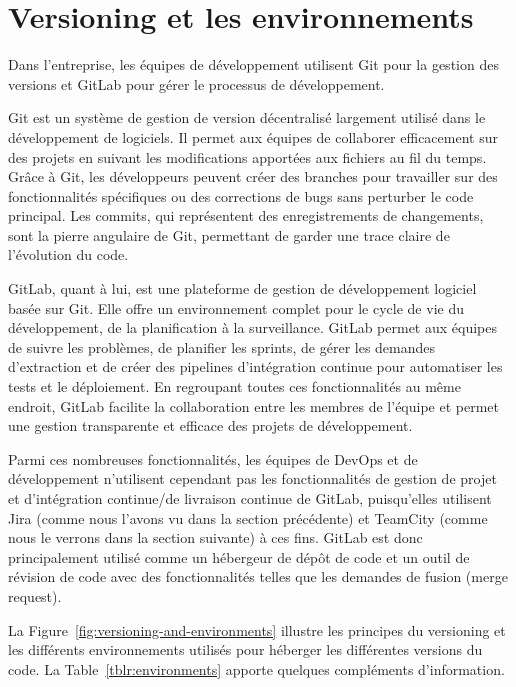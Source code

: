 \section{Versioning et les environnements}\label{sec:versioning-environments}

Dans l'entreprise, les équipes de développement utilisent Git pour la gestion des versions et GitLab pour gérer le processus de développement.

Git est un système de gestion de version décentralisé largement utilisé dans le développement de logiciels. Il permet aux équipes de collaborer efficacement sur des projets en suivant les modifications apportées aux fichiers au fil du temps. Grâce à Git, les développeurs peuvent créer des branches pour travailler sur des fonctionnalités spécifiques ou des corrections de bugs sans perturber le code principal. Les commits, qui représentent des enregistrements de changements, sont la pierre angulaire de Git, permettant de garder une trace claire de l'évolution du code.

GitLab, quant à lui, est une plateforme de gestion de développement logiciel basée sur Git. Elle offre un environnement complet pour le cycle de vie du développement, de la planification à la surveillance. GitLab permet aux équipes de suivre les problèmes, de planifier les sprints, de gérer les demandes d'extraction et de créer des pipelines d'intégration continue pour automatiser les tests et le déploiement. En regroupant toutes ces fonctionnalités au même endroit, GitLab facilite la collaboration entre les membres de l'équipe et permet une gestion transparente et efficace des projets de développement.

Parmi ces nombreuses fonctionnalités, les équipes de DevOps et de développement n'utilisent cependant pas les fonctionnalités de gestion de projet et d'intégration continue/de livraison continue de GitLab, puisqu'elles utilisent Jira (comme nous l'avons vu dans la section précédente) et TeamCity (comme nous le verrons dans la section suivante) à ces fins. GitLab est donc principalement utilisé comme un hébergeur de dépôt de code et un outil de révision de code avec des fonctionnalités telles que les demandes de fusion (merge request).

La Figure~\ref{fig:versioning-and-environments} illustre les principes du versioning et les différents environnements utilisés pour héberger les différentes versions du code. La Table~\ref{tblr:environments} apporte quelques compléments d'information.

